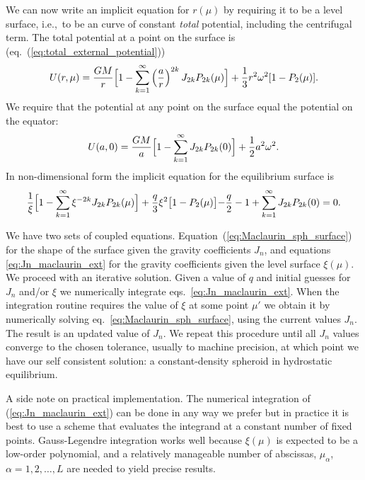 \documentclass[amsmath,amsfonts,rmp,letterpaper]{revtex4}
\newcommand{\om}{\omega}
\renewcommand{\inf}{\infty}
\begin{document}
We can now write an implicit equation for $r(\mu)$ by requiring it to be a level
surface, i.e.,~to be an curve of constant \emph{total} potential, including the
centrifugal term. The total potential at a point on the surface is
(eq.~(\ref{eq:total_external_potential}))
\begin{equation}
U(r,\mu) = \frac{GM}{r} \Bigl[ 1 -
\sum_{k=1}^{\infty}\left(\frac{a}{r}\right)^{2k} J_{2k}P_{2k}(\mu) \Bigr] + 
\frac{1}{3}r^2\om^2[1 - P_2(\mu)].
\end{equation}
We require that the potential at any point on the surface equal the potential on
the equator:
\begin{equation}
U(a,0) = \frac{GM}{a} \Bigl[1 - \sum_{k=1}^{\inf} J_{2k}P_{2k}(0) \Bigr] + 
\frac{1}{2}a^2\om^2.
\end{equation}
In non-dimensional form the implicit equation for the equilibrium surface is
\begin{equation}\label{eq:Maclaurin_sph_surface}
\frac{1}{\xi}\Bigl[1 - \sum_{k=1}^{\inf} \xi^{-2k} J_{2k} P_{2k}(\mu)\Bigr] + 
\frac{q}{3}\xi^2\bigl[1 - P_2(\mu)\bigl] - \frac{q}{2} - 1 +
\sum_{k=1}^{\inf}J_{2k}P_{2k}(0) = 0.
\end{equation}

We have two sets of coupled equations. Equation~(\ref{eq:Maclaurin_sph_surface})
for the shape of the surface given the gravity coefficients $J_n$, and equations 
\eqref{eq:Jn_maclaurin_ext} for the gravity coefficients given the level surface
$\xi(\mu)$. We proceed with an iterative solution. Given a value of $q$ and
initial guesses for $J_n$ and/or $\xi$ we numerically integrate
eqs.~\eqref{eq:Jn_maclaurin_ext}. When the integration routine requires the value
of $\xi$ at some point $\mu'$ we obtain it by numerically solving
eq.~\eqref{eq:Maclaurin_sph_surface}, using the current values $J_n$. The result
is an updated value of $J_n$. We repeat this procedure until all $J_n$ values
converge to the chosen tolerance, usually to machine precision, at which point we
have our self consistent solution: a constant-density spheroid in hydrostatic
equilibrium.

A side note on practical implementation. The numerical integration of
(\ref{eq:Jn_maclaurin_ext}) can be done in any way we prefer but in practice it is
best to use a scheme that evaluates the integrand at a constant number of fixed
points. Gauss-Legendre integration works well because $\xi(\mu)$ is expected to be
a low-order polynomial, and a relatively manageable number of abscissas,
$\mu_\alpha$, $\alpha=1,2,\ldots,L$ are needed to yield precise results.
\end{document}
